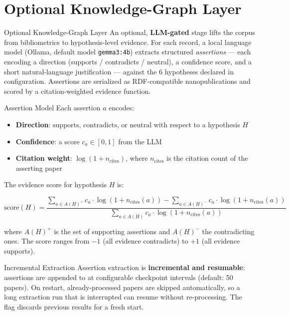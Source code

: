\documentclass[
  ignorenonframetext,
]{beamer}
\author{\texorpdfstring{}{}}
\date{}
\providecommand{\tightlist}{%
  \setlength{\itemsep}{0pt}\setlength{\parskip}{0pt}}
\begin{document}
\section{Optional Knowledge-Graph
Layer}\label{optional-knowledge-graph-layer}

\begin{frame}{Optional Knowledge-Graph Layer}
An optional, \textbf{LLM-gated} stage lifts the corpus from
bibliometrics to hypothesis-level evidence. For each record, a local
language model (Ollama, default model \texttt{gemma3:4b}) extracts
structured \emph{assertions} --- each encoding a direction (supports /
contradicts / neutral), a confidence score, and a short natural-language
justification --- against the 6 hypotheses declared in configuration.
Assertions are serialized as RDF-compatible nanopublications
 and scored by a citation-weighted evidence
function.
\end{frame}

\begin{frame}[allowframebreaks]{Assertion Model}
\protect{}\label{assertion-model}
Each assertion \(a\) encodes:

\begin{itemize}
\tightlist
\item
  \textbf{Direction}: \(\text{supports}\), \(\text{contradicts}\), or
  \(\text{neutral}\) with respect to a hypothesis \(H\)
\item
  \textbf{Confidence}: a score \(c_a \in [0, 1]\) from the LLM
\item
  \textbf{Citation weight}: \(\log(1 + n_{\text{cites}})\), where
  \(n_{\text{cites}}\) is the citation count of the asserting paper
\end{itemize}

The evidence score for hypothesis \(H\) is:

\[
\text{score}(H) = \frac{\sum_{a \in A(H)^+} c_a \cdot \log(1 + n_{\text{cites}}(a)) -
\sum_{a \in A(H)^-} c_a \cdot \log(1 + n_{\text{cites}}(a))}
{\sum_{a \in A(H)} c_a \cdot \log(1 + n_{\text{cites}}(a))}
\]

where \(A(H)^+\) is the set of supporting assertions and \(A(H)^-\) the
contradicting ones. The score ranges from \(-1\) (all evidence
contradicts) to \(+1\) (all evidence supports).
\end{frame}

\begin{frame}{Incremental Extraction}
\protect{}\label{incremental-extraction}
Assertion extraction is \textbf{incremental and resumable}: assertions
are appended to  at configurable
checkpoint intervals (default: 50 papers). On restart, already-processed
papers are skipped automatically, so a long extraction run that is
interrupted can resume without re-processing. The
 flag discards previous results for a fresh
start.
\end{frame}
\end{document}
